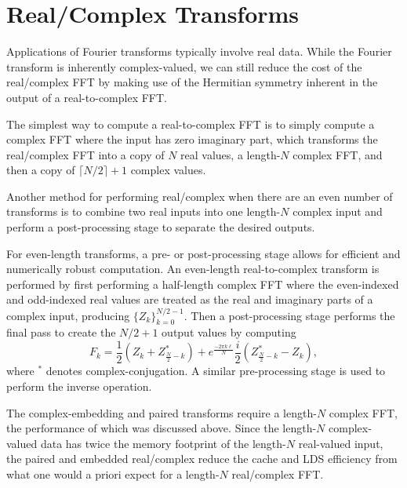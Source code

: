 \documentclass[blind]{gtac}
\def\({\left(}
\def\){\right)}
\begin{document}
\section{Real/Complex Transforms}
\label{sectionrealcomplex}

Applications of Fourier transforms typically involve real data.  While
the Fourier transform is inherently complex-valued, we can still
reduce the cost of the real/complex FFT by making use of the Hermitian
symmetry inherent in the output of a real-to-complex FFT.

The simplest way to compute a real-to-complex FFT is to simply compute
a complex FFT where the input has zero imaginary part, which
transforms the real/complex FFT into a copy of $N$ real values, a
length-$N$ complex FFT, and then a copy of $\lceil{}N/2\rceil{}+1$
complex values.

Another method for performing real/complex when there are an even
number of transforms is to combine two real inputs into one length-$N$
complex input and perform a post-processing stage to separate the
desired outputs.

For even-length transforms, a pre- or post-processing stage allows for
efficient and numerically robust computation.  An even-length
real-to-complex transform is performed by first performing a
half-length complex FFT where the even-indexed and odd-indexed real
values are treated as the real and imaginary parts of a complex input,
producing $\{Z_k\}_{k=0}^{N/2-1}$.  Then a post-processing stage
performs the final pass to create the $N/2+1$ output values by
computing
\begin{dmath}
  \label{rcpost}
  F_k
  = \frac{1}{2}\(Z_k + Z_{\frac{N}{2}-k}^*\)
  + e^{\frac{-2\pi{}k\ell}{N}} \frac{i}{2}\(Z_{\frac{N}{2}-k}^*-Z_k\),
\end{dmath}
where ${}^*$ denotes complex-conjugation.  A similar pre-processing
stage is used to perform the inverse operation.


The complex-embedding and paired transforms require a length-$N$
complex FFT, the performance of which was discussed above.  Since the
length-$N$ complex-valued data has twice the memory footprint of the
length-$N$ real-valued input, the paired and embedded real/complex
reduce the cache and LDS efficiency from what one would a priori
expect for a length-$N$ real/complex FFT.
\end{document}
